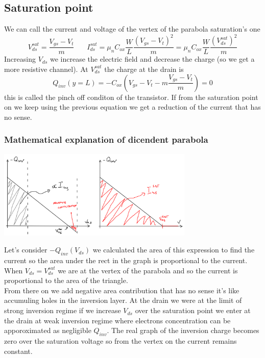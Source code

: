 \subsection{Saturation point}
We can call the current and voltage of the vertex of the parabola saturation's one 
\begin{equation}
V_{ds}^{sat}=\frac{V_{gs}-V_t}{m}\ \ \ \ \ \ \ \ I_{ds}^{sat}=\mu_nC_{ox}\frac{W}{L}\frac{(V_{gs}-V_t)^2}{m}=\mu_nC_{ox}\frac{W}{L}\frac{(V_{ds}^{sat})^2}{m}
\end{equation}
Increasing $V_{ds}$ we increase the electric field and decrease the charge (so we get a more resistive channel). At $V_{ds}^{sat}$ the charge at the drain is 
\begin{equation}
Q_{inv}(y=L)=-C_{ox}(V_{gs}-V_t-m \frac{V_{gs}-V_t}{m})=0
\end{equation}
this is called the pinch off conditon of the transistor. If from the saturation point on we keep using the previous equation we get a reduction of the current that has no sense.\\

\subsubsection{Mathematical explanation of dicendent parabola}

\centering
\includegraphics[width=0.7\textwidth]{mathexpl.png}\\
\raggedright

Let's consider $-Q_{inv}(V_{ds})$ we calculated the area of this expression to find the current so the area under the rect in the graph is proportional to the current. When $V_{ds}=V_{ds}^{sat}$ we are at the vertex of the parabola and so the current is proportional to the area of the triangle.\\
From there on we add negative area contribution that has no sense it's like accumuling holes in the inversion layer. At the drain we were at the limit of strong inversion regime if we increase $V_{ds}$ over the saturation point we enter at the drain at weak inversion regime where electrons concentration can be apporoximated as negligible $Q_{inv}$. The real graph of the inversion charge becomes zero over the saturation voltage so from the vertex on the current remains constant.\\


